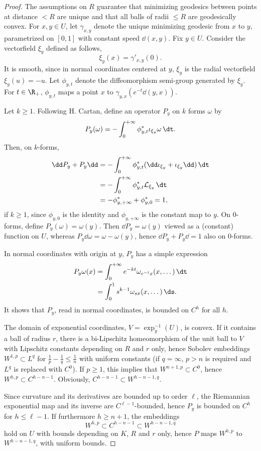 \begin{proof}
The assumptions on $R$ guarantee that minimizing geodesics between points at distance $<R$ are unique and that all balls of radii $\leq R$ are geodesically convex. For $x,y\in U$, let $\gamma_{x,y}$ denote the unique minimizing geodesic from $x$ to $y$, parametrized on $[0,1]$ with constant speed $\dd(x,y)$. Fix $y\in U$. Consider the vectorfield $\xi_y$ defined as follows,
\[
\xi_{y}(x)=\gamma'_{x,y}(0).
\]
It is smooth, since in normal coordinates centered at $y$, $\xi_{y}$ is the radial vectorfield $\xi_y(u)=-u$. Let $\phi_{y,t}$ denote the diffeomorphism semi-group generated by $\xi_y$. For $t\in\R_+$, $\phi_{y,t}$ maps a point $x$ to $\gamma_{y,x}(e^{-t}\dd(y,x))$.

Let $k\geq 1$. Following H. Cartan, define an operator $P_y$ on $k$ forms $\omega$ by
\[
P_y(\omega)=-\int_{0}^{+\infty}\phi_{y,t}^{*}\iota_{\xi_{y}}\omega\,\dt.
\]
Then, on $k$-forms,
\begin{align*}
\dd P_y+P_y\dd &=- \int_{0}^{+\infty}\phi_{y,t}^{*} (\dd\iota_{\xi_{y}} +
\iota_{\xi_{y}}\dd)\,\dt\\
&=-\int_{0}^{+\infty}\phi_{y,t}^{*}\mathcal{L}_{\xi_{y}}\,\dt\\
&=-\phi_{y,+\infty}^{*}+\phi_{y,0}^{*}=1,
\end{align*}
if $k\geq 1$, since $\phi_{y,0}$ is the identity and $\phi_{y,+\infty}$ is the constant map to $y$. On $0$-forms, define $P_y(\omega)=\omega(y)$. Then $\dd P_y=\omega(y)$ viewed as a (constant) function on $U$, whereas $P_y \dd\omega=\omega-\omega(y)$, hence $\dd P_y+P_y \dd=1$ also on $0$-forms.

In normal coordinates with origin at $y$, $P_y$ has a simple expression
\begin{align*}
P_y\omega(x)&=\int_{0}^{+\infty}e^{-kt}\omega_{e^{-t}x}(x,\dots)\,\dt\\
&=\int_{0}^{1}s^{k-1}\omega_{sx}(x,\dots)\,\ds.
\end{align*}
It shows that $P_y$, read in normal coordinates, is bounded on $C^h$ for all $h$.

The domain of exponential coordinates, $V=\exp_y^{-1}(U)$, is convex. If it contains a ball of radius $r$, there is a bi-Lipschitz homeomorphism of the unit ball to $V$ with Lipschitz constants depending on $R$ and $r$ only, hence Sobolev embeddings $W^{1,p}\subset L^q$ for $\frac{1}{p}-\frac{1}{q}\leq\frac{1}{n}$ with uniform constants (if $q=\infty$, $p>n$ is required and $L^q$ is replaced with $C^0$). If $p\geq 1$, this implies that $W^{n+1,p}\subset C^0$, hence $W^{h,p}\subset C^{h-n-1}$. Obviously, $C^{h-n-1}\subset W^{h-n-1,q}$.

Since curvature and its derivatives are bounded up to order $\ell$, the Riemannian exponential map and its inverse are $C^{\ell-1}$-bounded, hence $P_y$ is bounded on $C^h$ for $h \leq \ell-1$. If furthermore $h \geq n+1$, the embeddings
\[
W^{h,p}\subset C^{h-n-1}\subset W^{h-n-1,q}
\]
hold on $U$ with bounds depending on $K$, $R$ and $r$ only, hence $P$ maps $W^{h,p}$ to $W^{h-n-1,q}$, with uniform bounds.
\end{proof}


